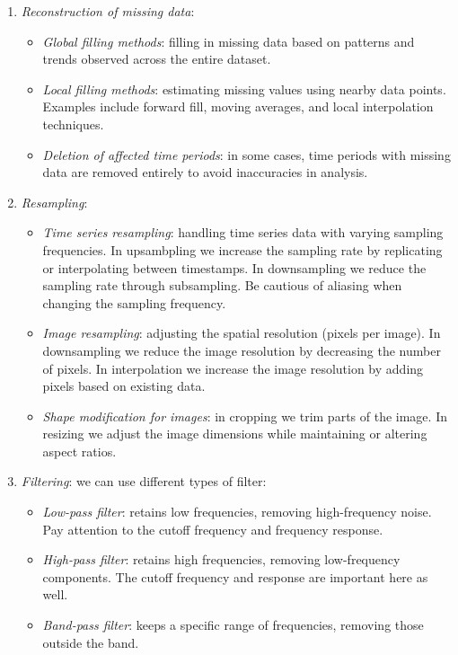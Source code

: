 \begin{enumerate}
    \item \textit{Reconstruction of missing data}:
        \begin{itemize}
            \item \textit{Global filling methods}: filling in missing data based on patterns and trends observed across the entire dataset.
            \item \textit{Local filling methods}: estimating missing values using nearby data points. Examples include forward fill, moving averages, and local interpolation techniques.
            \item \textit{Deletion of affected time periods}: in some cases, time periods with missing data are removed entirely to avoid inaccuracies in analysis.
        \end{itemize}
    \item \textit{Resampling}:
        \begin{itemize}
            \item \textit{Time series resampling}: handling time series data with varying sampling frequencies.
                In upsambpling we increase the sampling rate by replicating or interpolating between timestamps.
                In downsampling we reduce the sampling rate through subsampling.
                Be cautious of aliasing when changing the sampling frequency.
            \item \textit{Image resampling}: adjusting the spatial resolution (pixels per image).
                In downsampling we reduce the image resolution by decreasing the number of pixels.
                In interpolation we increase the image resolution by adding pixels based on existing data.
            \item \textit{Shape modification for images}: in cropping we trim parts of the image.
                In resizing we adjust the image dimensions while maintaining or altering aspect ratios.
        \end{itemize}
    \item \textit{Filtering}: we can use different types of filter: 
        \begin{itemize}
            \item \textit{Low-pass filter}: retains low frequencies, removing high-frequency noise. Pay attention to the cutoff frequency and frequency response.
            \item \textit{High-pass filter}: retains high frequencies, removing low-frequency components. The cutoff frequency and response are important here as well.
            \item \textit{Band-pass filter}: keeps a specific range of frequencies, removing those outside the band.
        \end{itemize}
\end{enumerate}

